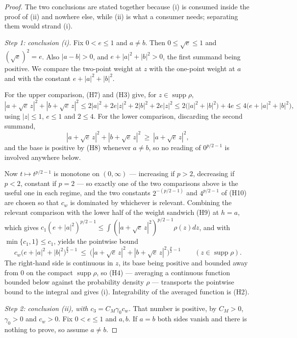 \begin{proof}
The two conclusions are stated together because (i) is consumed inside the
proof of (ii) and nowhere else, while (ii) is what a consumer needs; separating
them would strand (i).

\emph{Step 1: conclusion (i).}  Fix $0<e\le1$ and $a\ne b$.  Then
$0\le\sqrt e\le1$ and $(\sqrt e)^2=e$.  Also $|a-b|>0$, and
$e+|a|^2+|b|^2>0$, the first summand being positive.  We compare the two-point
weight at $z$ with the one-point weight at $a$ and with the constant
$e+|a|^2+|b|^2$.

For the upper comparison, (H7) and (H3) give, for $z\in\operatorname{supp}\rho$,
\[
|a+\sqrt e\,z|^2+|b+\sqrt e\,z|^2
\le2|a|^2+2e|z|^2+2|b|^2+2e|z|^2
\le2\bigl(|a|^2+|b|^2\bigr)+4e
\le4\bigl(e+|a|^2+|b|^2\bigr),
\]
using $|z|\le1$, $e\le1$ and $2\le4$.  For the lower comparison, discarding the
second summand,
\[
|a+\sqrt e\,z|^2+|b+\sqrt e\,z|^2\ \ge\ |a+\sqrt e\,z|^2 ,
\]
and the base is positive by (H8) whenever $a\ne b$, so no reading of
$0^{p/2-1}$ is involved anywhere below.

Now $t\mapsto t^{p/2-1}$ is monotone on $(0,\infty)$ --- increasing if
$p>2$, decreasing if $p<2$, constant if $p=2$ --- so exactly one of the two
comparisons above is the useful one in each regime, and the two constants
$2^{-(p/2-1)}$ and $4^{p/2-1}$ of (H10) are chosen so that $c_w$ is dominated
by whichever is relevant.  Combining the relevant comparison with the lower
half of the weight sandwich (H9) at $h=a$, which gives
$c_1(e+|a|^2)^{p/2-1}\le\int(|a+\sqrt e\,z|^2)^{p/2-1}\rho(z)dz$, and with
$\min\{c_1,1\}\le c_1$, yields the pointwise bound
\[
c_w\bigl(e+|a|^2+|b|^2\bigr)^{\frac p2-1}
\ \le\ \bigl(|a+\sqrt e\,z|^2+|b+\sqrt e\,z|^2\bigr)^{\frac p2-1}
\qquad(z\in\operatorname{supp}\rho).
\]
The right-hand side is continuous in $z$, its base being positive and bounded
away from $0$ on the compact $\operatorname{supp}\rho$, so (H4) --- averaging a
continuous function bounded below against the probability density $\rho$ ---
transports the pointwise bound to the integral and gives (i).  Integrability of
the averaged function is (H2).

\emph{Step 2: conclusion (ii), with $c_3=C_M\gamma_0c_w$.}  That number is
positive, by $C_M>0$, $\gamma_0>0$ and $c_w>0$.  Fix $0<e\le1$ and $a,b$.  If
$a=b$ both sides vanish and there is nothing to prove, so assume $a\ne b$.


\end{proof}
